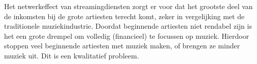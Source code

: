 Het netwerkeffect van streamingdiensten zorgt er voor dat het grootste deel van de inkomsten bij de grote artiesten terecht komt, zeker in vergelijking met de traditionele muziekindustrie.
Doordat beginnende artiesten niet rendabel zijn is het een grote drempel om volledig (financieel) te focussen op muziek. Hierdoor stoppen veel beginnende artiesten met muziek maken, of brengen ze minder muziek uit. Dit is een kwalitatief probleem.

